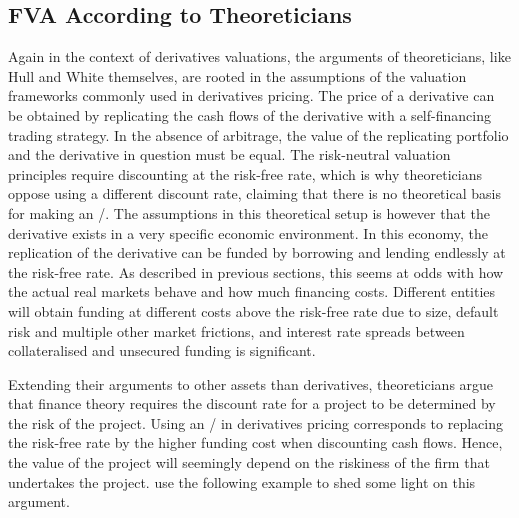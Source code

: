 \documentclass[main.tex]{subfiles}
\begin{document}
        \subsection{FVA According to Theoreticians}
            Again in the context of derivatives valuations, 
            the arguments of theoreticians, like Hull and White themselves, 
            are rooted in the assumptions of the valuation frameworks commonly used in derivatives pricing.
            The price of a derivative can be obtained by replicating the cash flows of the derivative 
            with a self-financing trading strategy. 
            In the absence of arbitrage, 
            the value of the replicating portfolio and the derivative in question must be equal.
            The risk-neutral valuation principles require discounting at the risk-free rate,
            which is why theoreticians oppose using a different discount rate,
            claiming that there is no theoretical basis for making an \FVA/.
            The assumptions in this theoretical setup is however 
            that the derivative exists in a very specific economic environment. 
            In this economy, the replication of the derivative
            can be funded by borrowing and lending endlessly at the risk-free rate.
            As described in previous sections,
            this seems at odds with how the actual real markets behave and how much financing costs.
            Different entities will obtain funding at different costs above the risk-free rate due to size,
            default risk and multiple other market frictions,
            and interest rate spreads between collateralised and unsecured funding is significant.

            Extending their arguments to other assets than derivatives, 
            theoreticians argue that finance theory requires the discount rate for a project 
            to be determined by the risk of the project.
            Using an \FVA/ in derivatives pricing corresponds to replacing the risk-free rate by the higher funding cost
            when discounting cash flows.
            Hence, the value of the project will seemingly depend on the riskiness of the firm that undertakes the project.
            \textcite{HullWhite2012FVA} use the following example to shed some light on this argument.
\end{document}
